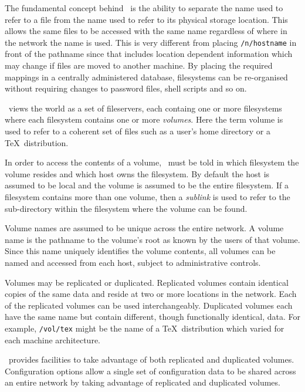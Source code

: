The fundamental concept behind \amd\ is the ability to separate the name used to refer to
a file from the name used to refer to its physical storage location.
This allows the same files to be accessed with the same name regardless of where
in the network the name is used.  This is very different from placing
{\tt /n/hostname} in front of the pathname since that includes location
dependent information which may change if files are moved to another
machine.
By placing the required mappings in a centrally administered database,
filesystems can be re-organised without requiring changes to password
files, shell scripts and so on.

\Amd\ views the world as a set of fileservers, each containg one or more filesystems
where each filesystem contains one or more {\em volumes}.
Here the term volume is used to refer to a coherent set of files such as a user's home directory or
a \TeX\ distribution.

In order to access the contents of a volume, \amd\ must be told in which filesystem
the volume resides and which host owns the filesystem.
By default the host is assumed to be local and the volume is
assumed to be the entire filesystem.
If a filesystem contains more than one volume, then a {\em sublink} is used to
refer to the sub-directory within the filesystem where the volume can be found.


Volume names are assumed to be unique across the entire network.
A volume name is the pathname to the volume's root as known by the
users of that volume.  Since this name uniquely identifies the volume contents,
all volumes can be named and accessed from each host, subject to
administrative controls.

Volumes may be replicated or duplicated.  Replicated volumes contain identical
copies of the same data and reside at two or more locations in the network.
Each of the replicated volumes can be used interchangeably.
Duplicated volumes each have the same name but contain different, though
functionally identical, data.  For example, {\tt /vol/tex} might be the
name of a \TeX\ distribution which varied for each machine architecture.

\Amd\ provides facilities to take advantage of both replicated and
duplicated volumes.  Configuration options allow a single set of configuration
data to be shared across an entire network by taking advantage of replicated
and duplicated volumes.


